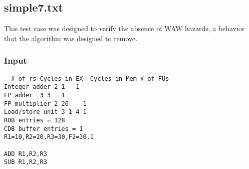 \documentclass[12pt]{article}
\begin{document}
\subsection{simple7.txt}
This test case was designed to verify the absence of WAW hazards, a behavior that the algorithm was designed to remove.

\subsubsection*{Input}
\begin{verbatim}
  # of rs Cycles in EX  Cycles in Mem # of FUs
Integer adder 2 1   1
FP adder  3 3   1
FP multiplier 2 20    1
Load/store unit 3 1 4 1
ROB entries = 128
CDB buffer entries = 1
R1=10,R2=20,R3=30,F2=30.1

ADD R1,R2,R3
SUB R1,R2,R3
\end{verbatim}
\end{document}
